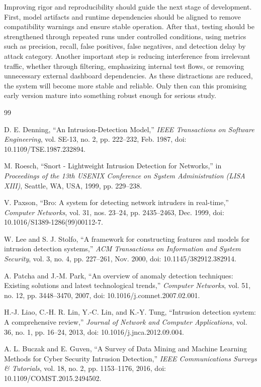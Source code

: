 \documentclass[conference]{IEEEtran}
\begin{document}
Improving rigor and reproducibility should guide the next stage of development. First, model artifacts and runtime dependencies should be aligned to remove compatibility warnings and ensure stable operation. After that, testing should be strengthened through repeated runs under controlled conditions, using metrics such as precision, recall, false positives, false negatives, and detection delay by attack category. Another important step is reducing interference from irrelevant traffic, whether through filtering, emphasizing internal test flows, or removing unnecessary external dashboard dependencies. As these distractions are reduced, the system will become more stable and reliable. Only then can this promising early version mature into something robust enough for serious study.

\begin{thebibliography}{99}

D. E. Denning, ``An Intrusion-Detection Model,'' \emph{IEEE Transactions on Software Engineering}, vol. SE-13, no. 2, pp. 222--232, Feb. 1987, doi: 10.1109/TSE.1987.232894.

M. Roesch, ``Snort - Lightweight Intrusion Detection for Networks,'' in \emph{Proceedings of the 13th USENIX Conference on System Administration (LISA XIII)}, Seattle, WA, USA, 1999, pp. 229--238.

V. Paxson, ``Bro: A system for detecting network intruders in real-time,'' \emph{Computer Networks}, vol. 31, nos. 23--24, pp. 2435--2463, Dec. 1999, doi: 10.1016/S1389-1286(99)00112-7.

W. Lee and S. J. Stolfo, ``A framework for constructing features and models for intrusion detection systems,'' \emph{ACM Transactions on Information and System Security}, vol. 3, no. 4, pp. 227--261, Nov. 2000, doi: 10.1145/382912.382914.

A. Patcha and J.-M. Park, ``An overview of anomaly detection techniques: Existing solutions and latest technological trends,'' \emph{Computer Networks}, vol. 51, no. 12, pp. 3448--3470, 2007, doi: 10.1016/j.comnet.2007.02.001.

H.-J. Liao, C.-H. R. Lin, Y.-C. Lin, and K.-Y. Tung, ``Intrusion detection system: A comprehensive review,'' \emph{Journal of Network and Computer Applications}, vol. 36, no. 1, pp. 16--24, 2013, doi: 10.1016/j.jnca.2012.09.004.

A. L. Buczak and E. Guven, ``A Survey of Data Mining and Machine Learning Methods for Cyber Security Intrusion Detection,'' \emph{IEEE Communications Surveys \& Tutorials}, vol. 18, no. 2, pp. 1153--1176, 2016, doi: 10.1109/COMST.2015.2494502.


\end{thebibliography}
\end{document}

